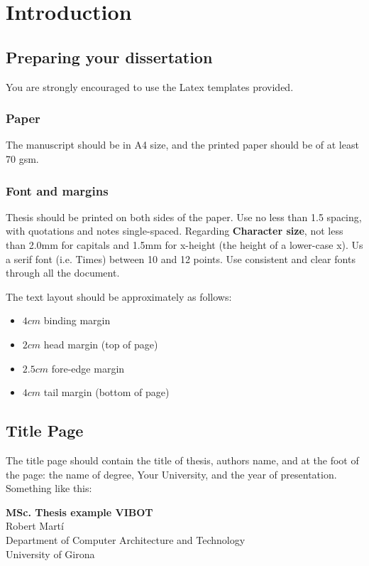 \chapter{Introduction} \label{chap:intro}

\section{Preparing your dissertation} \label{sect:thefirst}

You are strongly encouraged to use the Latex templates provided.

\subsection{Paper}
The manuscript should be in A4 size, and the printed paper should
be of at least 70 gsm.

\subsection{Font and margins}
Thesis should be printed on both sides of the paper. Use no less
than 1.5 spacing, with quotations and notes single-spaced.
Regarding \textbf{Character size}, not less than 2.0mm for
capitals and 1.5mm for x-height (the height of a lower-case x). Us
a serif font (i.e. Times) between 10 and 12 points. Use consistent
and clear fonts through all the document.

The text layout should be approximately as follows:

\begin{itemize}
    \item $4cm$ binding margin
    \item $2cm$ head margin (top of page)
    \item $2.5cm$ fore-edge margin
    \item $4cm$ tail margin (bottom of page)
\end{itemize}

\section{Title Page}
The title page should contain the title of thesis, authors name,
and at the foot of the page: the name of degree,  Your University,
and the year of presentation. Something like this:

\vspace*{1cm}
\begin{center}
{\Large\bf MSc. Thesis example VIBOT\\} \vspace{2cm} {\large
Robert Mart\'i\\
\vspace{1cm}
Department of Computer Architecture and Technology \\
University of Girona}

\end{center}

